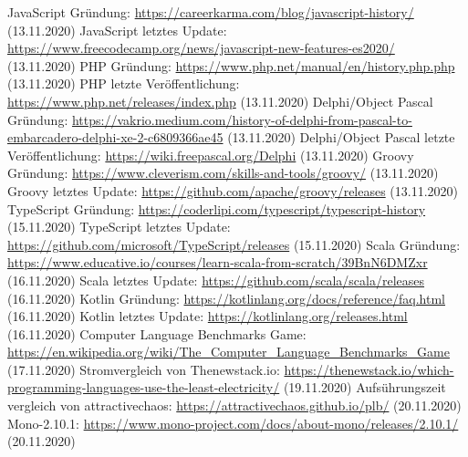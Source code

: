 \documentclass[ngerman]{article}
\begin{document}
\begin{thebibliography}{9}
        JavaScript Gründung: \url{https://careerkarma.com/blog/javascript-history/} (13.11.2020)
        JavaScript letztes Update: \url{https://www.freecodecamp.org/news/javascript-new-features-es2020/} (13.11.2020)
        PHP Gründung: \url{https://www.php.net/manual/en/history.php.php} (13.11.2020)
        PHP letzte Veröffentlichung: \url{https://www.php.net/releases/index.php} (13.11.2020)
        Delphi/Object Pascal Gründung: \url{https://vakrio.medium.com/history-of-delphi-from-pascal-to-embarcadero-delphi-xe-2-c6809366ae45} (13.11.2020)
        Delphi/Object Pascal letzte Veröffentlichung: \url{https://wiki.freepascal.org/Delphi} (13.11.2020)
        Groovy Gründung: \url{https://www.cleverism.com/skills-and-tools/groovy/} (13.11.2020)
        Groovy letztes Update: \url{https://github.com/apache/groovy/releases} (13.11.2020)
        TypeScript Gründung: \url{https://coderlipi.com/typescript/typescript-history} (15.11.2020)
        TypeScript letztes Update: \url{https://github.com/microsoft/TypeScript/releases} (15.11.2020)
        Scala Gründung: \url{https://www.educative.io/courses/learn-scala-from-scratch/39BnN6DMZxr} (16.11.2020)
        Scala letztes Update: \url{https://github.com/scala/scala/releases} (16.11.2020)
        Kotlin Gründung: \url{https://kotlinlang.org/docs/reference/faq.html} (16.11.2020)
        Kotlin letztes Update: \url{https://kotlinlang.org/releases.html} (16.11.2020)
        Computer Language Benchmarks Game: \url{https://en.wikipedia.org/wiki/The_Computer_Language_Benchmarks_Game} (17.11.2020)
        Stromvergleich von Thenewstack.io: \url{https://thenewstack.io/which-programming-languages-use-the-least-electricity/} (19.11.2020)
        Aufsührungszeit vergleich von attractivechaos: \url{https://attractivechaos.github.io/plb/} (20.11.2020)
        Mono-2.10.1: \url{https://www.mono-project.com/docs/about-mono/releases/2.10.1/} (20.11.2020)

\end{thebibliography}
\end{document}
